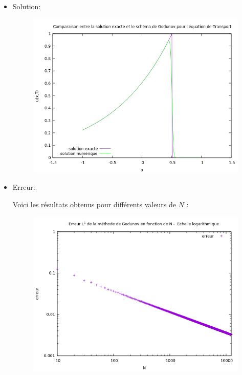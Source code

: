 \begin{itemize}

\item Solution: 

\begin{figure}[h!]
	\includegraphics[scale=0.7]{Images_Fichiers/godu1.png}
\end{figure}

\item Erreur:

Voici les résultats obtenus pour différents valeurs de $N$ :
\begin{figure}[h!]
	\includegraphics[scale=0.7]{Images_Fichiers/erreur1.png}
\end{figure}


\end{itemize}


